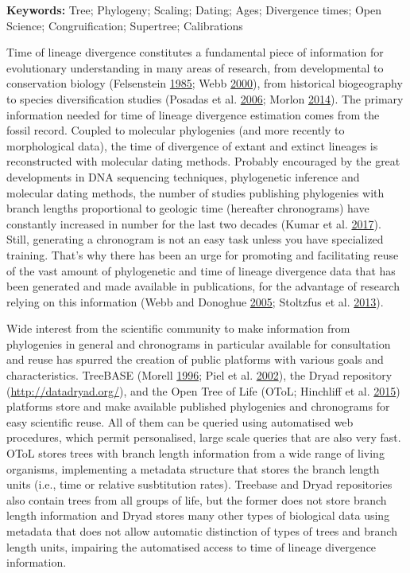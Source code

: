 \documentclass[]{article}
\begin{document}
\textbf{Keywords:} Tree; Phylogeny; Scaling; Dating; Ages; Divergence times; Open Science; Congruification; Supertree; Calibrations

\newpage

Time of lineage divergence constitutes a fundamental piece of information for evolutionary
understanding in many areas of research, from developmental to conservation biology (Felsenstein \protect\hyperlink{ref-Felsenstein1985a}{1985}; Webb \protect\hyperlink{ref-Webb2000}{2000}), from historical biogeography to species diversification studies (Posadas et al. \protect\hyperlink{ref-posadas2006historical}{2006}; Morlon \protect\hyperlink{ref-Morlon2014}{2014}). The primary information needed for time of lineage divergence estimation comes from the fossil record. Coupled to molecular phylogenies (and more recently to morphological data), the time of divergence of extant and extinct lineages is reconstructed with molecular dating methods.
Probably encouraged by the great developments in DNA sequencing techniques, phylogenetic inference and molecular dating methods, the number of studies publishing phylogenies with branch lengths proportional to geologic time (hereafter chronograms) have constantly increased in number for the last two decades (Kumar et al. \protect\hyperlink{ref-Kumar2017}{2017}).
Still, generating a chronogram is not an easy task unless you have specialized training. That's why there has been an urge for promoting and facilitating reuse of the vast amount of phylogenetic and time of lineage divergence data that has been generated and made available in publications, for the advantage of research relying on this information (Webb and Donoghue \protect\hyperlink{ref-webb2005phylomatic}{2005}; Stoltzfus et al. \protect\hyperlink{ref-Stoltzfus2013}{2013}).

Wide interest from the scientific community to make information from phylogenies in general and chronograms in particular available for consultation and reuse has spurred the creation of public platforms with various goals and characteristics. TreeBASE (Morell \protect\hyperlink{ref-morell1996roots}{1996}; Piel et al. \protect\hyperlink{ref-Piel2002}{2002}), the Dryad repository (\url{http://datadryad.org/}), and the Open Tree of Life (OToL; Hinchliff et al. \protect\hyperlink{ref-Hinchliff2015}{2015}) platforms store and make available published phylogenies and chronograms for easy scientific reuse. All of them can be queried using automatised web procedures, which permit personalised, large scale queries that are also very fast.
OToL stores trees with branch length information from a wide range of living organisms, implementing a metadata structure that stores the branch length units (i.e., time or relative susbtitution rates). Treebase and Dryad repositories also contain trees from all groups of life, but the former does not store branch length information and Dryad stores many other types of biological data using metadata that does not allow automatic distinction of types of trees and branch length units, impairing the automatised access to time of lineage divergence information.
\end{document}
